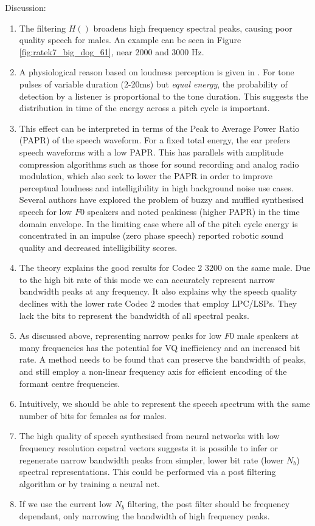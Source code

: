 \documentclass{article}
\begin{document}
Discussion:
\begin{enumerate}
\item The filtering $H()$ broadens high frequency spectral peaks, causing poor quality speech for males. An example can be seen in Figure \ref{fig:ratek7_big_dog_61}, near 2000 and 3000 Hz.
\item A physiological reason based on loudness perception is given in \cite[p 62]{moore97}. For tone pulses of variable duration (2-20ms) but \emph{equal energy}, the probability of detection by a listener is proportional to the tone duration. This suggests \cite{pobloth1999phase} the distribution in time of the energy across a pitch cycle is important. 
\item This effect can be interpreted in terms of the Peak to Average Power Ratio (PAPR) of the speech waveform. For a fixed total energy, the ear prefers speech waveforms with a low PAPR. This has parallels with amplitude compression algorithms such as those for sound recording and analog radio modulation, which also seek to lower the PAPR in order to improve perceptual loudness and intelligibility in high background noise use cases. Several authors \cite{mccree1992improving} \cite{sambur1978reducing} have explored the problem of buzzy and muffled synthesised speech for low $F0$ speakers and noted peakiness (higher PAPR) in the time domain envelope. In the limiting case where all of the pitch cycle energy is concentrated in an impulse (zero phase speech) \cite{xu2017distorting} reported robotic sound quality and decreased intelligibility scores.
\item The theory explains the good results for Codec 2 3200 on the same male.  Due to the high bit rate of this mode we can accurately represent narrow bandwidth peaks at any frequency.  It also explains why the speech quality declines with the lower rate Codec 2 modes that employ LPC/LSPs. They lack the bits to represent the bandwidth of all spectral peaks.
\item As discussed above, representing narrow peaks for low $F0$ male speakers at many frequencies has the potential for VQ inefficiency and an increased bit rate.  A method needs to be found that can preserve the bandwidth of peaks, and still employ a non-linear frequency axis for efficient encoding of the formant centre frequencies.
\item Intuitively, we should be able to represent the speech spectrum with the same number of bits for females as for males.
\item The high quality of speech synthesised from neural networks with low frequency resolution cepstral vectors suggests it is possible to infer or regenerate narrow bandwidth peaks from simpler, lower bit rate (lower $N_b$) spectral representations.  This could be performed via a post filtering algorithm or by training a neural net. 
\item If we use the current low $N_b$ filtering, the post filter should be frequency dependant, only narrowing the bandwidth of high frequency peaks.
\end{enumerate}
\end{document}
